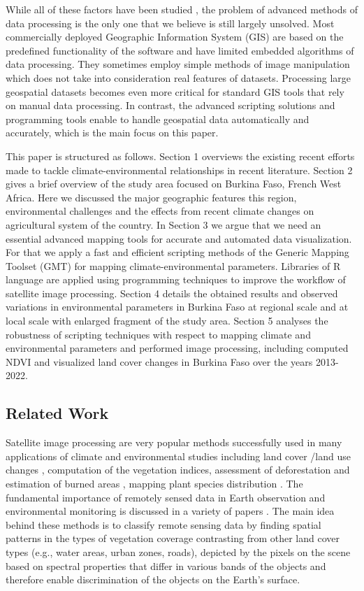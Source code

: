 \documentclass[atmosphere,article,submit,pdftex,moreauthors]{Definitions/mdpi}
\begin{document}
While all of these factors have been studied \cite{Mather1987,Bocksberger}, the problem of advanced methods of data processing is the only one that we believe is still largely unsolved. Most commercially deployed Geographic Information System (GIS) are based on the predefined functionality of the software and have limited embedded algorithms of data processing. They sometimes employ simple methods of image manipulation which does not take into consideration real features of datasets. Processing large geospatial datasets becomes even more critical for standard GIS tools that rely on manual data processing. In contrast, the advanced scripting solutions and  programming tools enable to handle geospatial data automatically and accurately, which is the main focus on this paper.

This paper is structured as follows. Section 1 overviews the existing recent efforts made to tackle climate-environmental relationships in recent literature. Section 2 gives a brief overview of the study area focused on Burkina Faso, French West Africa. Here we discussed the major geographic features this region, environmental challenges and the effects from recent climate changes on agricultural system of the country. In Section 3 we argue that we need an essential advanced mapping tools for accurate and automated data visualization. For that we apply a fast and efficient scripting methods of the Generic Mapping Toolset (GMT) for mapping climate-environmental parameters. Libraries of R language are applied using programming techniques to improve the workflow of satellite image processing. Section 4 details the obtained results and observed variations in environmental parameters in Burkina Faso at regional scale and at local scale with enlarged fragment of the study area. Section 5 analyses the robustness of scripting techniques with respect to mapping climate and environmental parameters and performed image processing, including computed NDVI and visualized land cover changes in Burkina Faso over the years 2013-2022.

\subsection{Related Work}
Satellite image processing are very popular methods successfully used in many applications of climate and environmental studies including land cover /land use changes \cite{4780024,Ouedraogo,rs70912076}, computation of the vegetation indices, assessment of deforestation and estimation of burned areas \cite{MUSYIMI201795}, mapping plant species distribution \cite{DEVINEAU20101092}. The fundamental importance of remotely sensed data in Earth observation and environmental monitoring is discussed in a variety of papers \cite{Wilmet}. The main idea behind these methods is to classify remote sensing data by finding spatial patterns in the types of vegetation coverage contrasting from other land cover types (e.g., water areas, urban zones, roads), depicted by the pixels on the scene based on spectral properties that differ in various bands of the objects \cite{Richards} and therefore enable discrimination of the objects on the Earth's surface. 
\end{document}
